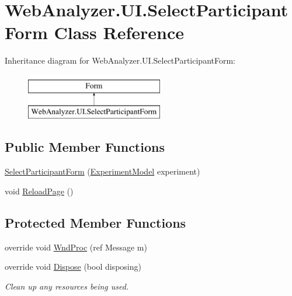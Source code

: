 \hypertarget{class_web_analyzer_1_1_u_i_1_1_select_participant_form}{}\section{Web\+Analyzer.\+U\+I.\+Select\+Participant\+Form Class Reference}
\label{class_web_analyzer_1_1_u_i_1_1_select_participant_form}
Inheritance diagram for Web\+Analyzer.\+U\+I.\+Select\+Participant\+Form\+:\begin{figure}[H]
\begin{center}
\leavevmode
\includegraphics[height=2.000000cm]{class_web_analyzer_1_1_u_i_1_1_select_participant_form}
\end{center}
\end{figure}
\subsection*{Public Member Functions}
\begin{DoxyCompactItemize}
\item 
\hyperlink{class_web_analyzer_1_1_u_i_1_1_select_participant_form_a82850c88bc4d315c7fedd26333c844bd}{Select\+Participant\+Form} (\hyperlink{class_web_analyzer_1_1_models_1_1_base_1_1_experiment_model}{Experiment\+Model} experiment)
\item 
void \hyperlink{class_web_analyzer_1_1_u_i_1_1_select_participant_form_a57b7487ec9db48f92f0d741566c68a24}{Reload\+Page} ()
\end{DoxyCompactItemize}
\subsection*{Protected Member Functions}
\begin{DoxyCompactItemize}
\item 
override void \hyperlink{class_web_analyzer_1_1_u_i_1_1_select_participant_form_a384ab9932611a45d7ad7e938104474c7}{Wnd\+Proc} (ref Message m)
\item 
override void \hyperlink{class_web_analyzer_1_1_u_i_1_1_select_participant_form_ae4a0da7ef5d15438618315aaa48fc565}{Dispose} (bool disposing)
\begin{DoxyCompactList}\small\item\em Clean up any resources being used. \end{DoxyCompactList}\end{DoxyCompactItemize}
